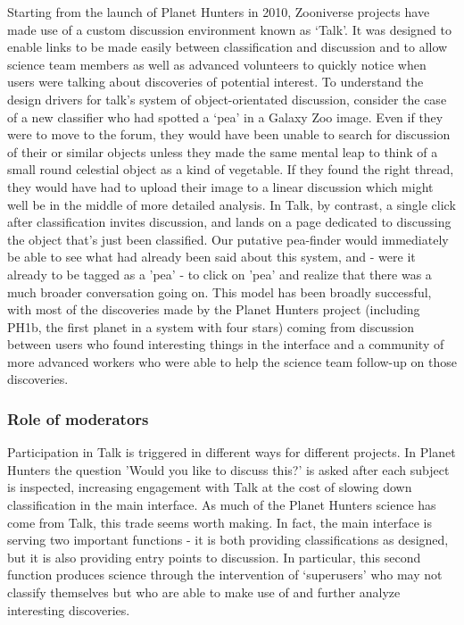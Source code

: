 \documentclass{sigchi}
\begin{document}
Starting from the launch of Planet Hunters in 2010, Zooniverse projects have made use of a custom discussion environment known as `Talk'. It was designed to enable links to be made easily between classification and discussion and to allow science team members as well as advanced volunteers to quickly notice when users were talking about discoveries of potential interest. To understand the design drivers for talk's system of object-orientated discussion, consider the case of a new classifier who had spotted a `pea' in a Galaxy Zoo image. Even if they were to move to the forum, they would have been unable to search for discussion of their or similar objects unless they made the same mental leap to think of a small round celestial object as a kind of vegetable. If they found the right thread, they would have had to upload their image to a linear discussion which might well be in the middle of more detailed analysis. In Talk, by contrast, a single click after classification invites discussion, and lands on a page dedicated to discussing the object that's just been classified. Our putative pea-finder would immediately be able to see what had already been said about this system, and - were it already to be tagged as a 'pea' - to click on 'pea' and realize that there was a much broader conversation going on. This model has been broadly successful, with most of the discoveries made by the Planet Hunters project (including PH1b, the first planet in a system with four stars) coming from discussion between users who found interesting things in the interface and a community of more advanced workers who were able to help the science team follow-up on those discoveries. 

\subsubsection{Role of moderators}
Participation in Talk is triggered in different ways for different projects. In Planet Hunters the question 'Would you like to discuss this?' is asked after each subject is inspected, increasing engagement with Talk at the cost of slowing down classification in the main interface. As much of the Planet Hunters science has come from Talk, this trade seems worth making. In fact, the main interface is serving two important functions - it is both providing classifications as designed, but it is also providing entry points to discussion. In particular, this second function produces science through the intervention of `superusers' who may not classify themselves but who are able to make use of and further analyze interesting discoveries. 
\end{document}
